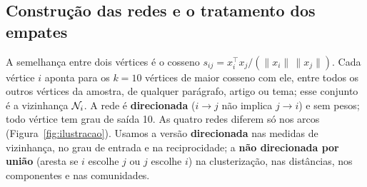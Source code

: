 \subsection{Construção das redes e o tratamento dos empates}\label{sec:knn}

A semelhança entre dois vértices é o cosseno $s_{ij}=x_i^\top x_j/(\lVert x_i\rVert\,\lVert
x_j\rVert)$. Cada vértice $i$ aponta para os $k=10$ vértices de
maior cosseno com ele, entre todos os outros vértices da amostra, de qualquer parágrafo, artigo
ou tema; esse conjunto é a vizinhança $\mathcal{N}_i$. A rede é \textbf{direcionada} ($i\to j$ não implica
$j\to i$) e sem pesos; todo vértice tem grau de saída 10. As quatro redes diferem só nos arcos
(Figura~\ref{fig:ilustracao}). Usamos a versão \textbf{direcionada} nas medidas de vizinhança,
no grau de entrada e na reciprocidade; a \textbf{não direcionada por união} (aresta se $i$
escolhe $j$ ou $j$ escolhe $i$) na clusterização, nas distâncias, nos componentes e nas
comunidades.

